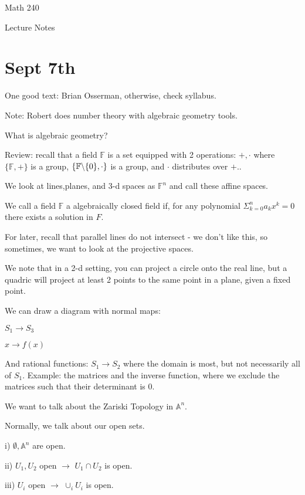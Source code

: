 \documentclass[10pt]{article}
\begin{document}
\begin{Large}
\centerline{Math 240}
\centerline{Lecture Notes}  %
\centerline{\bf }       %
\centerline{}      %
\end{Large}


\vspace{2em}
\section*{Sept 7th}
One good text: Brian Osserman, otherwise, check syllabus.

Note: Robert does number theory with algebraic geometry tools.

What is algebraic geometry?

Review: recall that a field $\mathbb{F}$ is a set equipped with 2 operations: $+, \cdot$ where $\{ \mathbb{F}, +\}$ is a group, $\{\mathbb{F}\symbol{92} \{0\}, \cdot\}$ is a group, and $\cdot$ distributes over $+$..

We look at lines,planes, and 3-d spaces as $\mathbb{F}^n$  and call these affine spaces.

We call a field $\mathbb{F}$ a algebraically closed field if, for any polynomial $\Sigma_{k=0}^n a_k x^k = 0$ there exists a solution in $F$.

For later, recall that parallel lines do not intersect - we don’t like this, so sometimes, we want to look at the projective spaces.

We note that in a 2-d setting, you can project a circle onto the real line, but a quadric will project at least 2 points to the same point in a plane, given a fixed point.

We can draw a diagram with normal maps:

$S_1 \rightarrow S_3$

$x \rightarrow f(x)$

And rational functions: $S_1 \rightarrow S_2$ where the domain is most, but not necessarily all of $S_1$. Example: the matrices and the inverse function, where we exclude the matrices such that their determinant is $0$.

We want to talk about the Zariski Topology in $\mathbb{A}^n$.

Normally, we talk about our open sets.

i) $\emptyset, \mathbb{A}^n$ are open.

ii) $U_1, U_2$ open $\rightarrow$ $U_1 \cap U_2$ is open.

iii) $U_i$ open $\rightarrow$ $\cup_i U_i$ is open.
\end{document}
